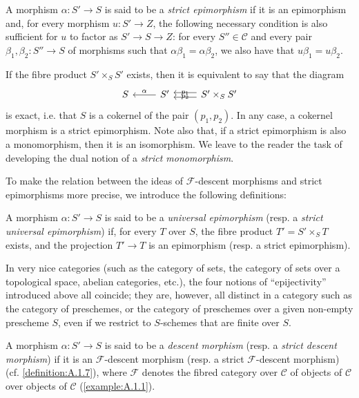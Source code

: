 \documentclass{article}
\theoremstyle{plain}
\theoremstyle{definition}
\newenvironment{definition}[1]
  {\renewcommand\theinnercustomdefinition{#1}\innercustomdefinition}
  {\endinnercustomdefinition}
\newcommand{\sh}[1]{{\mathscr{#1}}}
\newcommand{\cat}[1]{{\mathcal{#1}}}
\newcommand{\oldpage}[1]{\marginpar{\footnotesize$\Big\vert$ \textit{p.~#1}}}
\begin{document}
\begin{definition}{2.2}
\label{definition:A.2.2}
  A morphism $\alpha\colon S'\to S$ is said to be a \emph{strict epimorphism} if it is an epimorphism and, for every morphism $u\colon S'\to Z$, the following necessary condition is also sufficient for $u$ to factor as $S'\to S\to Z$:
  for every $S''\in\cat{C}$ and every pair $\beta_1,\beta_2\colon S''\to S$ of morphisms such that $\alpha\beta_1=\alpha\beta_2$, we also have that $u\beta_1=u\beta_2$.
\end{definition}

If the fibre product $S'\times_S S'$ exists, then it is equivalent to say that the diagram
\[
  \begin{tikzcd}
    S
    & S' \lar[swap,"\alpha"]
    & S'\times_S S'\lar[shift left=1,swap,"p_1"] \lar[shift right=1,"p_2"]
  \end{tikzcd}
\]
\oldpage{190-07}
is exact, i.e. that $S$ is a cokernel of the pair $(p_1,p_2)$.
In any case, a cokernel morphism is a strict epimorphism.
Note also that, if a strict epimorphism is also a monomorphism, then it is an isomorphism.
We leave to the reader the task of developing the dual notion of a \emph{strict monomorphism}.

To make the relation between the ideas of $\sh{F}$-descent morphisms and strict epimorphisms more precise, we introduce the following definitions:

\begin{definition}{2.3}
  A morphism $\alpha\colon S'\to S$ is said to be a \emph{universal epimorphism} (resp. a \emph{strict universal epimorphism}) if, for every $T$ over $S$, the fibre product $T'=S'\times_S T$ exists, and the projection $T'\to T$ is an epimorphism (resp. a strict epimorphism).
\end{definition}

In very nice categories (such as the category of sets, the category of sets over a topological space, abelian categories, etc.), the four notions of ``epijectivity'' introduced above all coincide;
they are, however, all distinct in a category such as the category of preschemes, or the category of preschemes over a given non-empty prescheme $S$, even if we restrict to $S$-schemes that are finite over $S$.

\begin{definition}{2.4}
  A morphism $\alpha\colon S'\to S$ is said to be a \emph{descent morphism} (resp. a \emph{strict descent morphism}) if it is an $\sh{F}$-descent morphism (resp. a strict $\sh{F}$-descent morphism) (cf. \cref{definition:A.1.7}), where $\sh{F}$ denotes the fibred category over $\cat{C}$ of objects of $\cat{C}$ over objects of $\cat{C}$ (\cref{example:A.1.1}).
\end{definition}
\end{document}
